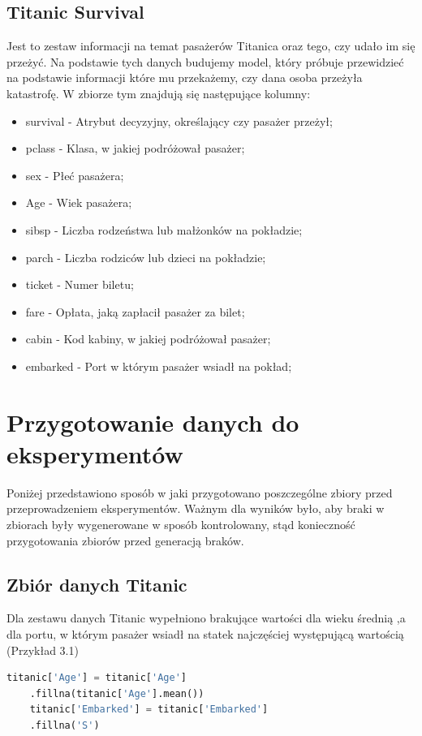 \documentclass[oneside]{book}
\begin{document}
\subsection{Titanic Survival}
Jest to zestaw informacji na temat pasażerów Titanica oraz tego, 
czy udało im się przeżyć. Na podstawie tych danych budujemy model, 
który próbuje przewidzieć na podstawie informacji które mu przekażemy, 
czy dana osoba przeżyła katastrofę. W zbiorze tym znajdują się
następujące kolumny:
\begin{itemize}
    \item survival - Atrybut decyzyjny, określający czy pasażer przeżył;
    \item pclass - Klasa, w jakiej podróżował pasażer;
    \item sex - Płeć pasażera;
    \item Age - Wiek pasażera;
    \item sibsp - Liczba rodzeństwa lub małżonków na pokładzie;
    \item parch - Liczba rodziców lub dzieci na pokładzie;
    \item ticket - Numer biletu;
    \item fare - Opłata, jaką zapłacił pasażer za bilet;
    \item cabin - Kod kabiny, w jakiej podróżował pasażer;
    \item embarked - Port w którym pasażer wsiadł na pokład;
\end{itemize}

\section{Przygotowanie danych do eksperymentów}

Poniżej przedstawiono sposób w jaki przygotowano poszczególne zbiory
przed przeprowadzeniem eksperymentów. Ważnym dla wyników było, aby 
braki w zbiorach były wygenerowane w sposób kontrolowany, stąd konieczność 
przygotowania zbiorów przed generacją braków.



\subsection{Zbiór danych Titanic}
Dla zestawu danych Titanic wypełniono 
brakujące wartości dla wieku średnią ,a dla portu, w którym pasażer
wsiadł na statek najczęściej występującą wartością (Przykład 3.1)
 \begin{lstlisting}[language=Python, caption={Przygotowanie zbioru danych Titanic do eksperymentów}, captionpos=b]
    titanic['Age'] = titanic['Age']
    .fillna(titanic['Age'].mean())
    titanic['Embarked'] = titanic['Embarked']
    .fillna('S')
\end{lstlisting}
\end{document}
